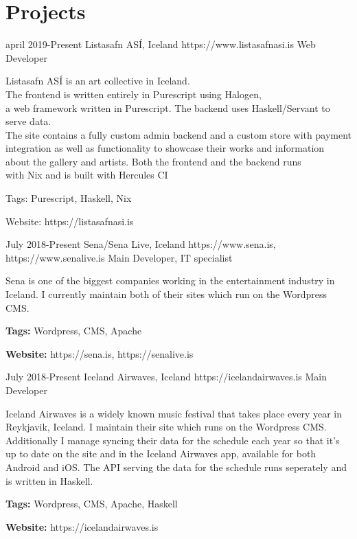 \documentclass[10pt]{article} %
\begin{document}

\section{Projects}

\job
{april 2019-}{Present}
{Listasafn ASÍ, Iceland}
{https://www.listasafnasi.is}
{Web Developer}
{Listasafn ASÍ is an art collective in Iceland.\\
The frontend is written entirely in Purescript using Halogen,\\
a web framework written in Purescript. The backend uses Haskell/Servant to serve data.\\
The site contains a fully custom admin backend and a custom store with payment\\
integration as well as functionality to showcase their works and information\\
about the gallery and artists. Both the frontend and the backend runs\\
with Nix and is built with Hercules CI\\
\rule{0mm}{5mm}Tags: Purescript, Haskell, Nix\\
\rule{0mm}{5mm}Website: https://listasafnasi.is}

\job
{July 2018-}{Present}
{Sena/Sena Live, Iceland}
{https://www.sena.is, https://www.senalive.is}
{Main Developer, IT specialist}
{Sena is one of the biggest companies working in the entertainment industry in Iceland. I currently maintain both of their sites which run on the Wordpress CMS.\\
\rule{0mm}{5mm}\textbf{Tags:} Wordpress, CMS, Apache\\
\rule{0mm}{5mm}\textbf{Website: }https://sena.is, https://senalive.is}

\job
{July 2018-}{Present}
{Iceland Airwaves, Iceland}
{https://icelandairwaves.is}
{Main Developer}
{Iceland Airwaves is a widely known music festival that takes place every year in Reykjavik, Iceland. I maintain their site which runs on the Wordpress CMS. Additionally I manage syncing their data for the schedule each year so that it's up to date on the site and in the Iceland Airwaves app, available for both Android and iOS. The API serving the data for the schedule runs seperately and is written in Haskell.\\
\rule{0mm}{5mm}\textbf{Tags:} Wordpress, CMS, Apache, Haskell\\
\rule{0mm}{5mm}\textbf{Website:} https://icelandairwaves.is
}
\end{document}
